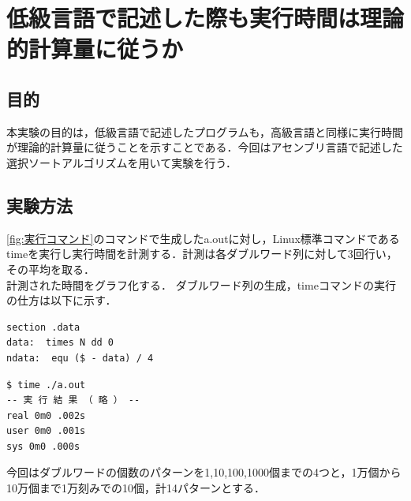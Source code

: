 \chapter{低級言語で記述した際も実行時間は理論的計算量に従うか}
\section{目的}
本実験の目的は，低級言語で記述したプログラムも，高級言語と同様に実行時間が理論的計算量に従うことを示すことである．今回はアセンブリ言語で記述した選択ソートアルゴリズムを用いて実験を行う．
\section{実験方法}
\ref{fig:実行コマンド}のコマンドで生成したa.outに対し，Linux標準コマンドであるtimeを実行し実行時間を計測する．計測は各ダブルワード列に対して3回行い，その平均を取る．\\
計測された時間をグラフ化する．
ダブルワード列の生成，timeコマンドの実行の仕方は以下に示す．
\begin{lstlisting}[numbers={none}, caption={ダブルワード列の生成（N=データ数)}]
    section .data
data:  times N dd 0
ndata:  equ ($ - data) / 4
\end{lstlisting}
\begin{lstlisting}[numbers={none}, caption={timeの実行(realが実行時間)}]
$ time ./a.out
-- 実 行 結 果 （ 略 ） --
real 0m0 .002s
user 0m0 .001s
sys 0m0 .000s
\end{lstlisting}
今回はダブルワードの個数のパターンを1,10,100,1000個までの4つと，1万個から10万個まで1万刻みでの10個，計14パターンとする．

\clearpage

